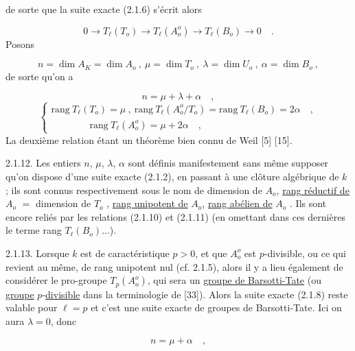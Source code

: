 
de sorte que la suite exacte (2.1.6) s'écrit alors

\begin{equation}\tag{2.1.8}
0 \longrightarrow T_\ell(T_o) \longrightarrow T_\ell(A_o^o) \longrightarrow T_\ell(B_o) \longrightarrow 0 \quad .
\end{equation}
Posons

\begin{equation}\tag{2.1.9}
n = \dim A_K = \dim A_o \ , \ \mu = \dim T_o \ , \ \lambda = \dim U_o \ , \ \alpha = \dim B_o \ ,
\end{equation}
de sorte qu'on a

\begin{equation}\tag{2.1.10}
n = \mu + \lambda + \alpha \quad ,
\end{equation}
\begin{equation}\tag{2.1.11}
\left\{
\begin{array}{l}
\mathrm{rang}\ T_\ell(T_o) = \mu \ , \ \mathrm{rang}\ T_\ell(A_o^o/T_o) = \mathrm{rang}\ T_\ell(B_o) = 2\alpha \quad , \\[1ex]
\qquad\qquad \mathrm{rang}\ T_\ell(A_o^o) = \mu + 2\alpha \quad ,
\end{array}
\right.
\end{equation}
La deuxième relation étant un théorème bien connu de Weil [5] [15].

2.1.12. Les entiers $n$, $\mu$, $\lambda$, $\alpha$ sont définis manifestement sans même supposer qu'on dispose d'une suite exacte (2.1.2), en passant à une clôture algébrique de $k$ ; ils sont connus respectivement sous le nom de dimension de $A_o$, \underline{rang réductif de} $A_o$ $=$ dimension de $T_o$ , \underline{rang unipotent de} $A_o$, \underline{rang abélien de} $A_o$ . Ils sont encore reliés par les relations (2.1.10) et (2.1.11) (en omettant dans ces dernières le terme rang $T_\ell(B_o)$...).

2.1.13. Lorsque $k$ est de caractéristique $p > 0$, et que $A_o^o$ est $p$-divisible, ou ce qui revient au même, de rang unipotent nul (cf. 2.1.5), alors il y a lieu également de considérer le pro-groupe $T_p(A_o^o)$, qui sera un \underline{groupe de Barsotti-Tate} (ou \underline{groupe} $p$-\underline{divisible} dans la terminologie de [33]). Alors la suite exacte (2.1.8) reste valable pour $\ell = p$ et c'est une suite exacte de groupes de Barsotti-Tate. Ici on aura $\lambda = 0$, donc

\begin{equation}\tag{2.1.13.1}
n = \mu + \alpha \quad ,
\end{equation}

